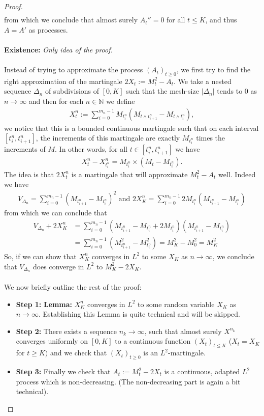 \documentclass[../mainfile.tex]{subfiles}
\begin{document}
\begin{proof}
\begin{align*}
\end{align*}
from which we conclude that almost surely $A_t''=0$ for all $t \leq K$, and thus $A=A'$ as processes. 
\\\\
\textbf{Existence:} \textit{Only idea of the proof.}\\
\\
Instead of trying to approximate the process $(A_t)_{t \geq 0}$, we first try to find the right approximation of the martingale $2X_t:= M_t^2-A_t$. We take a nested sequence $\Delta_n$ of subdivisions of $[0,K]$ such that the mesh-size $|\Delta_n|$ tends to $0$ as $n \to \infty$ and then for each $n \in \mathbb{N}$ we define
\begin{align*}
X_t^n := \sum_{i=0}^{m_n-1} M_{t_i^n} (M_{t \wedge t_{i+1}^n}- M_{t \wedge t_i^n}), 
\end{align*}
we notice that this is a bounded continuous martingale such that on each interval $[t_i^n, t_{i+1}^n]$, the increments of this martingale are exactly $M_{t_i^n}$ times the increments of $M$. In other words, for all $t \in [t_i^n, t_{i+1}^n]$ we have
\begin{align*}
X_t^n-X_{t_i^n}^n = M_{t_i^n} \times (M_t-M_{t_i^n}). 
\end{align*}
\newpage
The idea is that $2X_t^n$ is a martingale that will approximate $M_t^2-A_t$ well. Indeed we have \begin{align*}
V_{\Delta_n} = \sum_{i=0}^{m_n-1} ( M_{t_{i+1}^n}-M_{t_i^n})^2 \text{ and } 2X_K^n = \sum_{i=0}^{m_n-1} 2M_{t_i^n}(M_{t_{i+1}^n}-M_{t_i^n})
\end{align*}
from which we can conclude that
\begin{align*}
V_{\Delta_n} + 2X_K^n &= \sum_{i=0}^{m_n-1} (M_{t_{i+1}^n}-M_{t_i^n}+2M_{t_i^n})(M_{t_{i+1}^n}-M_{t_i^n}) \\
&= \sum_{i=0}^{m_n-1} (M_{t_{i+1}^n}^2-M_{t_i^n}^2) = M_K^2-M_0^2=M_K^2 
\end{align*}
So, if we can show that $X_K^n$ converges in $L^2$ to some $X_K$ as $n \to \infty$, we conclude that $V_{\Delta_n}$ does converge in $L^2$ to $M_K^2-2X_K$.
\\\\
We now briefly outline the rest of the proof:
\begin{itemize}
\item \textbf{Step 1:} \textbf{Lemma:} $X_K^n$ converges in $L^2$ to some random variable $X_K$ as $n \to \infty$. Establishing this Lemma is quite technical and will be skipped. 
\item \textbf{Step 2:} There exists a sequence $n_k \to \infty$, such that almost surely $X^{n_k}$ converges uniformly on $[0,K]$ to a continuous function $(X_t)_{t \leq K}$ ($X_t=X_K$ for $t \geq K)$ and we check that $(X_t)_{t \geq 0}$ is an $L^2$-martingale. 
\item \textbf{Step 3:} Finally we check that $A_t:= M_t^2-2X_t$ is a continuous, adapted $L^2$ process which is non-decreasing. (The non-decreasing part is again a bit technical).
\end{itemize}
\end{proof}
\end{document}
